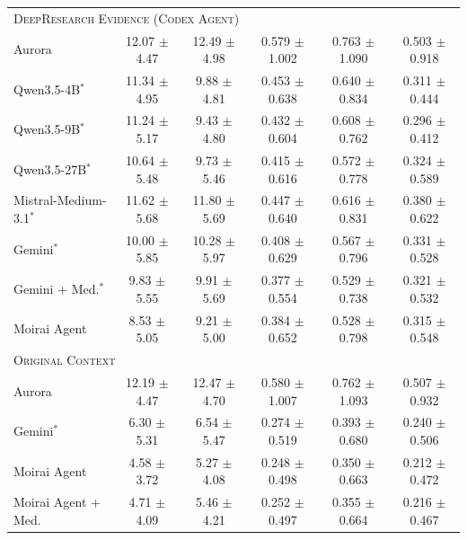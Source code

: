 \documentclass[]{servicenow}
\begin{document}
\begin{table}[h]
{\begin{tabular}{lccccc}
\midrule
\multicolumn{6}{l}{\textsc{DeepResearch Evidence (Codex Agent)}} \\
\addlinespace[2pt]
\hspace{1.2em}Aurora & 12.07 $\pm$ 4.47 & 12.49 $\pm$ 4.98 & 0.579 $\pm$ 1.002 & 0.763 $\pm$ 1.090 & 0.503 $\pm$ 0.918 \\
\hspace{1.2em}Qwen3.5-4B$^\ast$ & 11.34 $\pm$ 4.95 & 9.88 $\pm$ 4.81 & 0.453 $\pm$ 0.638 & 0.640 $\pm$ 0.834 & 0.311 $\pm$ 0.444 \\
\hspace{1.2em}Qwen3.5-9B$^\ast$ & 11.24 $\pm$ 5.17 & 9.43 $\pm$ 4.80 & 0.432 $\pm$ 0.604 & 0.608 $\pm$ 0.762 & 0.296 $\pm$ 0.412 \\
\hspace{1.2em}Qwen3.5-27B$^\ast$ & 10.64 $\pm$ 5.48 & 9.73 $\pm$ 5.46 & 0.415 $\pm$ 0.616 & 0.572 $\pm$ 0.778 & 0.324 $\pm$ 0.589 \\
\hspace{1.2em}Mistral-Medium-3.1$^\ast$ & 11.62 $\pm$ 5.68 & 11.80 $\pm$ 5.69 & 0.447 $\pm$ 0.640 & 0.616 $\pm$ 0.831 & 0.380 $\pm$ 0.622 \\
\hspace{1.2em}Gemini$^\ast$ & 10.00 $\pm$ 5.85 & 10.28 $\pm$ 5.97 & 0.408 $\pm$ 0.629 & 0.567 $\pm$ 0.796 & 0.331 $\pm$ 0.528 \\
\hspace{1.2em}Gemini + Med.$^\ast$ & 9.83 $\pm$ 5.55 & 9.91 $\pm$ 5.69 & 0.377 $\pm$ 0.554 & 0.529 $\pm$ 0.738 & 0.321 $\pm$ 0.532 \\
\hspace{1.2em}Moirai Agent & 8.53 $\pm$ 5.05 & 9.21 $\pm$ 5.00 & 0.384 $\pm$ 0.652 & 0.528 $\pm$ 0.798 & 0.315 $\pm$ 0.548 \\

\midrule
\multicolumn{6}{l}{\textsc{Original Context}} \\
\addlinespace[2pt]
\hspace{1.2em}Aurora & 12.19 $\pm$ 4.47 & 12.47 $\pm$ 4.70 & 0.580 $\pm$ 1.007 & 0.762 $\pm$ 1.093 & 0.507 $\pm$ 0.932 \\
\hspace{1.2em}Gemini$^\ast$ & 6.30 $\pm$ 5.31 & 6.54 $\pm$ 5.47 & 0.274 $\pm$ 0.519 & 0.393 $\pm$ 0.680 & 0.240 $\pm$ 0.506 \\
\hspace{1.2em}Moirai Agent & 4.58 $\pm$ 3.72 & 5.27 $\pm$ 4.08 & 0.248 $\pm$ 0.498 & 0.350 $\pm$ 0.663 & 0.212 $\pm$ 0.472 \\
\hspace{1.2em}Moirai Agent + Med. & 4.71 $\pm$ 4.09 & 5.46 $\pm$ 4.21 & 0.252 $\pm$ 0.497 & 0.355 $\pm$ 0.664 & 0.216 $\pm$ 0.467 \\

\bottomrule
\end{tabular}%
}
\end{table}
\end{document}
